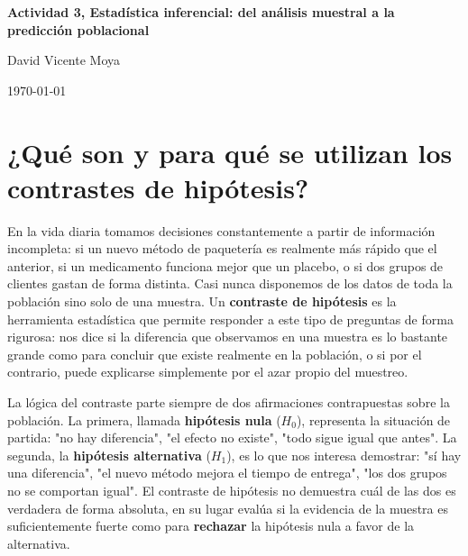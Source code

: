 \documentclass[11pt, a4paper]{article}
\begin{document}
\begin{titlepage}
\centering

\vspace*{\fill}

{\Huge \textbf{Actividad 3, Estadística inferencial: del análisis muestral a 
la predicción poblacional}\par}

\vspace{1.5cm}

{\Large David Vicente Moya\par}

\vspace{0.5cm}

{\large \today\par}

\vspace*{\fill}

\end{titlepage}

\newpage
\tableofcontents
\thispagestyle{empty}
\setcounter{page}{0}

\newpage

\section{¿Qué son y para qué se utilizan los contrastes de hipótesis?}

En la vida diaria tomamos decisiones constantemente a partir de información incompleta: si 
un nuevo método de paquetería es realmente más rápido que el anterior, si un medicamento 
funciona mejor que un placebo, o si dos grupos de clientes gastan de forma distinta. Casi 
nunca disponemos de los datos de toda la población sino solo de una muestra. Un 
\textbf{contraste de hipótesis} es la herramienta estadística que permite responder a este 
tipo de preguntas de forma rigurosa: nos dice si la diferencia que observamos en una 
muestra es lo bastante grande como para concluir que existe realmente en la población, o si 
por el contrario, puede explicarse simplemente por el azar propio del muestreo.

La lógica del contraste parte siempre de dos afirmaciones contrapuestas sobre la población. 
La primera, llamada \textbf{hipótesis nula} ($H_0$), representa la situación de partida: 
"no hay diferencia", "el efecto no existe", "todo sigue igual que antes". La segunda, 
la \textbf{hipótesis alternativa} ($H_1$), es lo que nos interesa demostrar: "sí hay una 
diferencia", "el nuevo método mejora el tiempo de entrega", "los dos grupos no se comportan 
igual". El contraste de hipótesis no demuestra cuál de las dos es verdadera de forma 
absoluta, en su lugar evalúa si la evidencia de la muestra es suficientemente fuerte como 
para \textbf{rechazar} la hipótesis nula a favor de la alternativa.
\end{document}
